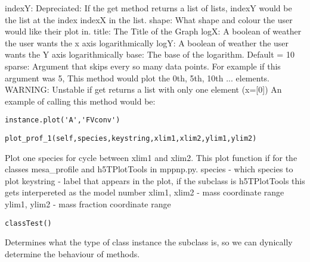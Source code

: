 		indexY: Depreciated: If the get method returns a list of lists, indexY
			would be the list at the index indexX in the list.\newline
		shape: What shape and colour the user would like their plot in.
		       \newline
		title: The Title of the Graph \newline
		logX: A boolean of weather the user wants the x axis logarithmically\newline
		logY: A boolean of weather the user wants the Y axis logarithmically\newline
		base: The base of the logarithm. Default = 10\newline
		sparse: Argument that skips every so many data points. For 
			example if this argument was 5, This method would plot
			the 0th, 5th, 10th ... elements.\newline
		WARNING: Unstable if get returns a list with only one element (x=[0])\newline
An example of calling this method would be:
\begin{verbatim}
instance.plot('A','FVconv')
\end{verbatim}

\begin{verbatim}
plot_prof_1(self,species,keystring,xlim1,xlim2,ylim1,ylim2)
\end{verbatim}
Plot one species for cycle between xlim1 and xlim2. This plot function if for the classes mesa\_profile and h5TPlotTools in mppnp.py.\newline		
	species      - which species to plot \newline
	keystring    - label that appears in the plot, if the subclass is h5TPlotTools this gets interpereted as the model number \newline
	xlim1, xlim2 - mass coordinate range\newline                                                 
	ylim1, ylim2 - mass fraction coordinate range\newline


\begin{verbatim}
classTest()
\end{verbatim}
Determines what the type of class instance the subclass is, so
		we can dynically determine the behaviour of methods.
		
